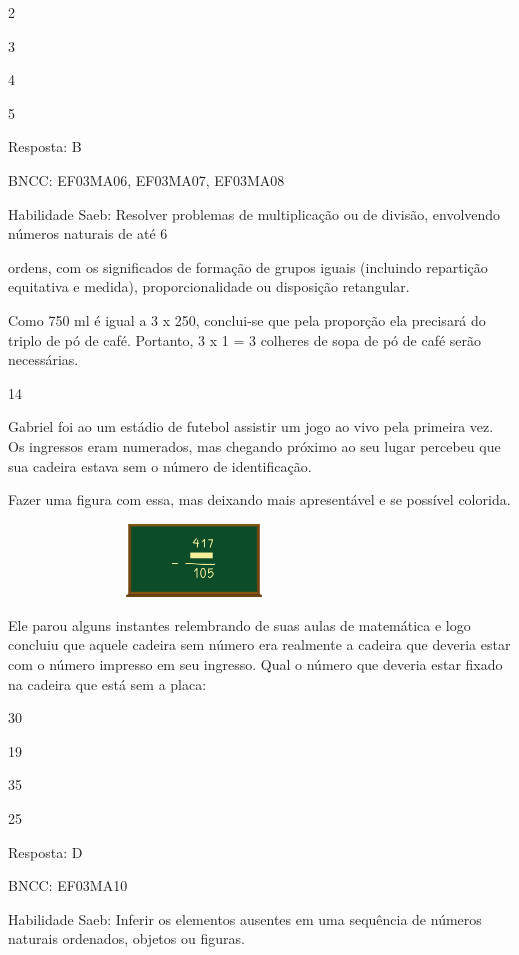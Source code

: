 \begin{escolha}
{\begin{escolha}
{\begin{escolha}
\item
  2
\item
  3
\item
  4
\item
  5
\end{escolha}

Resposta: B

BNCC: EF03MA06, EF03MA07, EF03MA08

Habilidade Saeb: Resolver problemas de multiplicação ou de divisão,
envolvendo números naturais de até 6

ordens, com os significados de formação de grupos iguais (incluindo
repartição equitativa e medida), proporcionalidade ou disposição
retangular.

Como 750 ml é igual a 3 x 250, conclui-se que pela proporção ela
precisará do triplo de pó de café. Portanto, 3 x 1 = 3 colheres de sopa
de pó de café serão necessárias.

\num{14}

Gabriel foi ao um estádio de futebol assistir um jogo ao vivo pela
primeira vez. Os ingressos eram numerados, mas chegando próximo ao seu
lugar percebeu que sua cadeira estava sem o número de identificação.

Fazer uma figura com essa, mas deixando mais apresentável e se possível
colorida.

\includegraphics[width=3.87534in,height=0.76673in]{media/image122.png}

Ele parou alguns instantes relembrando de suas aulas de matemática e
logo concluiu que aquele cadeira sem número era realmente a cadeira que
deveria estar com o número impresso em seu ingresso. Qual o número que
deveria estar fixado na cadeira que está sem a placa:

\begin{escolha}
\item
  30
\item
  19
\item
  35
\item
  25
\end{escolha}

Resposta: D

BNCC: EF03MA10

Habilidade Saeb: Inferir os elementos ausentes em uma sequência de
números naturais ordenados, objetos ou figuras.

}
\end{escolha}}
\end{escolha}
